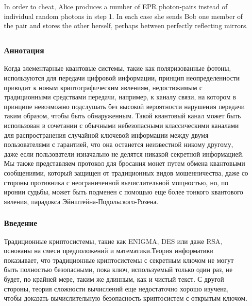 In order to cheat, Alice produces a number of EPR photon-pairs instead of individual random pho­tons in step 1. In each case she sends Bob one mem­ber of the pair and stores the other herself, per­haps between perfectly reflecting mirrors. 


\subsection{\trnas}

\subsubsection*{Аннотация}
Когда элементарные квантовые системы, такие как поляризованные фотоны, используются для передачи цифровой информации, принцип неопределенности приводит к новым криптографическим явлениям, недостижимым с традиционными средствами передачи, например, к каналу связи, на котором в принципе невозможно подслушать без высокой вероятности нарушения передачи таким образом, чтобы быть обнаруженным. Такой квантовый канал может быть использован в сочетании с обычными небезопасными классическими каналами для распространения случайной ключевой информации между двумя пользователями с гарантией, что она останется неизвестной никому другому, даже если пользователи изначально не делятся никакой секретной информацией. Мы также представляем протокол для бросания монет путем обмена квантовыми сообщениями, который защищен от традиционных видов мошенничества, даже со стороны противника с неограниченной вычислительной мощностью, но, по иронии судьбы, может быть подменен с помощью еще более тонкого квантового явления, парадокса Эйнштейна-Подольского-Розена.

\subsubsection{Введение}

­­Традиционные криптосистемы, такие как ENIGMA, DES или даже RSA, основаны на смеси предположений и математики.Теория информатики показывает, что традиционные криптосистемы с секретным ключом не могут быть полностью безопасными, пока ключ, используемый только один раз, не будет, по крайней мере, таким же длинным, как и чистый текст. С другой стороны, теория сложности вычислений еще недостаточно хорошо изучена, чтобы доказать вычислительную безопасность криптосистем с открытым ключом.

